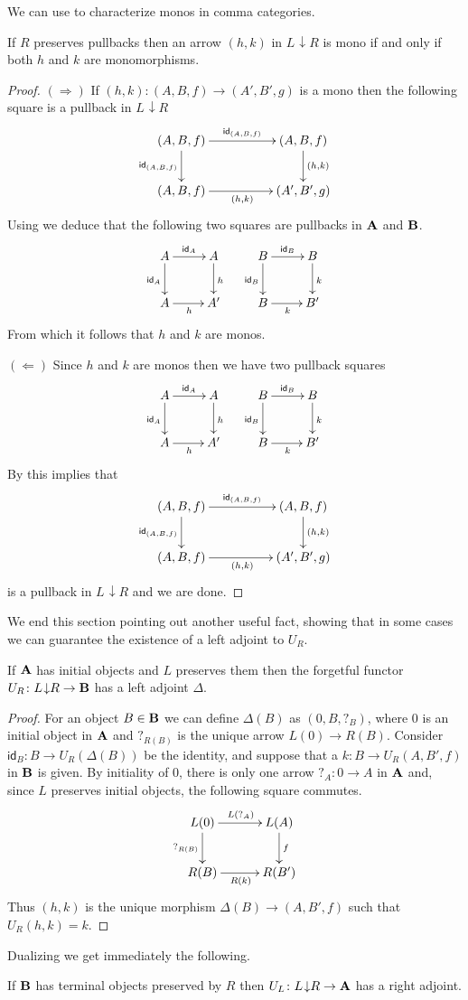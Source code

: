 \documentclass[runningheads,envcountsect]{llncs}
\def\B{\textbf {\textup{B}}}
\def\A{\textbf {\textup{A}}}
\newcommand{\comma}[2]{#1\hspace{1pt} {\downarrow}#2}
\newcommand{\id}[1]{\mathsf{id}_{#1}}
\begin{document}
We can use  to characterize monos in comma categories. 
\begin{corollary}\label{cor:mono}
	If $R$ preserves pullbacks then an arrow $(h,k)$ in $\comma{L}{R}$ is mono if and only if both $h$ and $k$ are monomorphisms.
\end{corollary}
\begin{proof}
	$(\Rightarrow)$  If $(h,k)\colon (A,B,f)\to (A', B', g)$ is a mono then the following square is a pullback in $\comma{L}{R}$
	\[\xymatrix@C=50pt{(A, B, f)  \ar[r]^{\id{(A,B,f)}} \ar[d]_{\id{(A,B,f)}}& (A, B, f)  \ar[d]^{(h,k)} \\ (A, B, f)  \ar[r]_{(h,k)}& (A', B', g) }\]
	Using  we deduce that the following two squares are pullbacks in $\A$ and $\B$.
	\[\xymatrix{A \ar[r]^{\id{A}} \ar[d]_{\id{A}} & A \ar[d]^{h} & B \ar[r]^{\id{B}} \ar[d]_{\id{B}} & B  \ar[d]^{k}\\ A \ar[r]_{h} & A' & B \ar[r]_{k} & B'}\]
	From which it follows that $h$ and $k$ are monos.
	
	\smallskip\noindent 
	$(\Leftarrow)$ Since $h$ and $k$ are monos then we have two pullback squares 	
	\[\xymatrix{A \ar[r]^{\id{A}} \ar[d]_{\id{A}} & A \ar[d]^{h} & B \ar[r]^{\id{B}} \ar[d]_{\id{B}} & B  \ar[d]^{k}\\ A \ar[r]_{h} & A' & B \ar[r]_{k} & B'}\]
	By  this implies that 
	\[\xymatrix@C=50pt{(A, B, f)  \ar[r]^{\id{(A,B,f)}} \ar[d]_{\id{(A,B,f)}}& (A, B, f)  \ar[d]^{(h,k)} \\ (A, B, f)  \ar[r]_{(h,k)}& (A', B', g) }\]
	is a pullback in $\comma{L}{R}$ and we are done.
\end{proof}

We end this section pointing out another useful fact,  showing that in some cases we can guarantee  the existence of a left adjoint to $U_R$. 

\begin{proposition}\label{prop:left}
	If $\A$ has initial objects and $L$ preserves them then the forgetful functor $U_R\colon \comma{L}{R}\to \B$ has a left adjoint $\Delta$.
\end{proposition}
\begin{proof} For an object $B\in \B$ we can define $\Delta(B)$ as $(0, B, ?_{B})$, where $0$ is an initial object in $\A$ and $?_{R(B)}$ is the unique arrow $L(0)\to R(B)$. Consider $\id{B}\colon B\to U_R(\Delta(B))$ be the identity, and suppose that a $k\colon B\to U_R(A, B', f)$ in $\B$ is given. By initiality of $0$, there is only one arrow $?_A\colon 0\to A $ in $\A$ and, since $L$ preserves initial objects, the following square commutes.
	\[\xymatrix@C=30pt{L(0) \ar[r]^{L(?_A)} \ar[d]_{?_{R(B)}} & L(A) \ar[d]^{f}\\ R(B) \ar[r]_{R(k)}& R(B')}\]
	Thus $(h,k)$ is the unique morphism $\Delta(B)\to (A, B', f)$	such that $U_R(h,k)=k$.
\end{proof}
Dualizing we get immediately the following.
\begin{corollary}If $\B$ has terminal objects preserved by $R$ then $U_L\colon \comma{L}{R}\to \A$ has a right adjoint.
\end{corollary}
\end{document}
